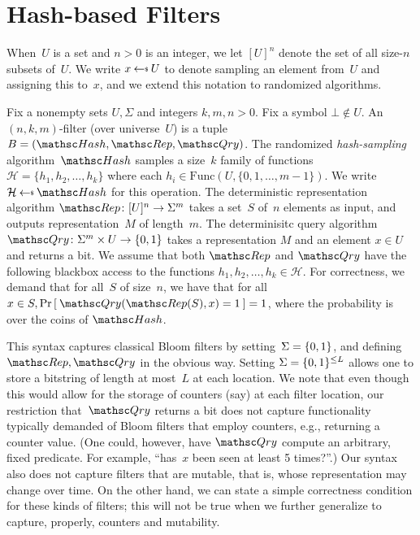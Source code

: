 \section{Hash-based Filters}
When~$U$ is a set and $n>0$ is an integer, we let $[U]^n$ denote the set of all size-$n$ subsets of~$U$.  
We write $x \getsr U$ to denote sampling an element from~$U$ and assigning this to~$x$, and we extend this notation to randomized algorithms.

Fix a nonempty sets $U,\Sigma$ and integers $k,m,n>0$.  Fix a symbol $\bot \not\in U$.  An $(n,k,m)$-filter (over universe~$U$) is a tuple  $B=(\Hash,\Rep,\Qry)$.   
%
The randomized \emph{hash-sampling} algorithm~$\Hash$ samples a size~$k$ family of functions~$\mathcal{H}=\{h_1,h_2,\ldots,h_k\}$ where each $h_i \in  \mathrm{Func}(U,\{0,1,\ldots,m-1\})$.  We write $\mathcal{H} \getsr \Hash$ for this operation.
%
The deterministic representation algorithm $\Rep\colon [U]^n \rightarrow \Sigma^m$ takes a set~$S$ of~$n$ elements as input, and outputs representation~$M$ of length~$m$.
%
The determinisitc query algorithm $\Qry\colon \Sigma^m \times U \rightarrow \bits$ takes a representation $M$ and an element $x \in U$ and returns a bit.  
%
We assume that both $\Rep$ and $\Qry$ have the following blackbox access to the functions $h_1,h_2,\ldots,h_k \in \mathcal{H}$.
%
For correctness, we demand that for all~$S$ of size~$n$, we have that for all $x \in S, \Prob{\Qry(\Rep(S),x)=1}=1$, where the probability is over the coins of $\Hash$.  


This syntax captures classical Bloom filters by setting~$\Sigma=\{0,1\}$,  and defining $\Rep,\Qry$ in the obvious way.  Setting $\Sigma=\{0,1\}^{\leq L}$ allows one to store a bitstring of length at most~$L$ at each location.   We note that even though this would allow for the storage of counters (say) at each filter location, our restriction that~$\Qry$ returns a bit does not capture functionality typically demanded of Bloom filters that employ counters, e.g., returning a counter value. (One could, however, have $\Qry$ compute an arbitrary, fixed predicate.  For example, ``has~$x$ been seen at least 5 times?''.)  
Our syntax also does not capture filters that are mutable, that is, whose representation may change over time. 
On the other hand, we can state a simple correctness condition for these kinds of filters; this will not be true when we further generalize to capture, properly, counters and mutability.

